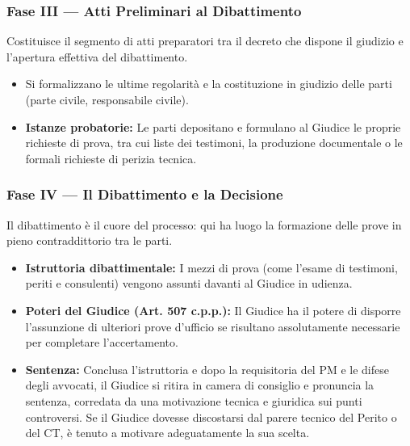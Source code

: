 \documentclass[11pt,a4paper]{article}
\begin{document}
\subsubsection{Fase III --- Atti Preliminari al Dibattimento}
Costituisce il segmento di atti preparatori tra il decreto che dispone il giudizio e l'apertura effettiva del dibattimento.
\begin{itemize}
    \item Si formalizzano le ultime regolarità e la costituzione in giudizio delle parti (parte civile, responsabile civile).
    \item \textbf{Istanze probatorie:} Le parti depositano e formulano al Giudice le proprie richieste di prova, tra cui liste dei testimoni, la produzione documentale o le formali richieste di perizia tecnica. 
\end{itemize}

\subsubsection{Fase IV --- Il Dibattimento e la Decisione}
Il dibattimento è il cuore del processo: qui ha luogo la formazione delle prove in pieno contraddittorio tra le parti.
\begin{itemize}
    \item \textbf{Istruttoria dibattimentale:} I mezzi di prova (come l'esame di testimoni, periti e consulenti) vengono assunti davanti al Giudice in udienza.
    \item \textbf{Poteri del Giudice (Art. 507 c.p.p.):} Il Giudice ha il potere di disporre l'assunzione di ulteriori prove d'ufficio se risultano assolutamente necessarie per completare l'accertamento.
    \item \textbf{Sentenza:} Conclusa l'istruttoria e dopo la requisitoria del PM e le difese degli avvocati, il Giudice si ritira in camera di consiglio e pronuncia la sentenza, corredata da una motivazione tecnica e giuridica sui punti controversi. Se il Giudice dovesse discostarsi dal parere tecnico del Perito o del CT, è tenuto a motivare adeguatamente la sua scelta.
\end{itemize}
\end{document}
